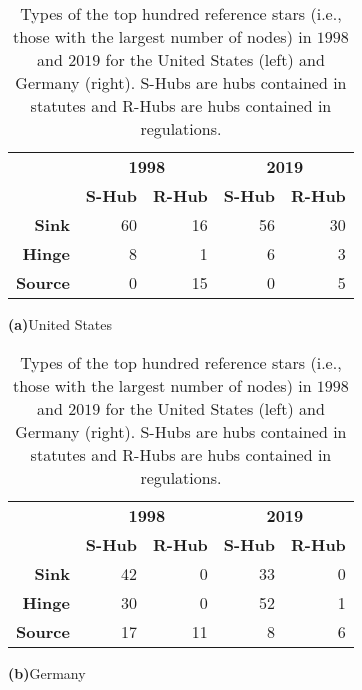 \documentclass[utf8,sort&compress,table,hidelinks]{frontiersFPHY} %
\begin{document}
\begin{table}
	\centering
\renewcommand{\arraystretch}{1.5}
\begin{multicols}{2}
	\begin{tabular}{rrrrr}
\toprule&\multicolumn{2}{c}{\textbf{1998}}&\multicolumn{2}{c}{\textbf{2019}}\\
        &   \textbf{S-Hub} &   \textbf{R-Hub} &   \textbf{S-Hub} &   \textbf{R-Hub} \\
\midrule
   \textbf{Sink} &           60 &           16 &           56 &           30 \\
  \textbf{Hinge} &            8 &            1 &            6 &            3 \\
 \textbf{Source} &            0 &           15 &            0 &            5 \\
\bottomrule
\end{tabular}

	{\vspace*{6pt}\small \textbf{\textsf{(a)}}\quad United States}\vspace*{6pt}
	\newpage
	\begin{tabular}{rrrrr}
\toprule&\multicolumn{2}{c}{\textbf{1998}}&\multicolumn{2}{c}{\textbf{2019}}\\
        &   \textbf{S-Hub} &   \textbf{R-Hub} &   \textbf{S-Hub} &   \textbf{R-Hub} \\
\midrule
   \textbf{Sink} &           42 &            0 &           33 &            0 \\
  \textbf{Hinge} &           30 &            0 &           52 &            1 \\
 \textbf{Source} &           17 &           11 &            8 &            6 \\
\bottomrule
\end{tabular}
	
	{\vspace*{6pt}\small \textbf{\textsf{(b)}}\quad Germany}
\end{multicols}

	\caption{%
		Types of the top hundred reference stars (i.e., those with the largest number of nodes) in $1998$ and $2019$ for the United States (left) and Germany (right). S-Hubs are hubs contained in statutes and R-Hubs are hubs contained in regulations.
	}\label{tab:star-statistics}
\end{table}
\end{document}
